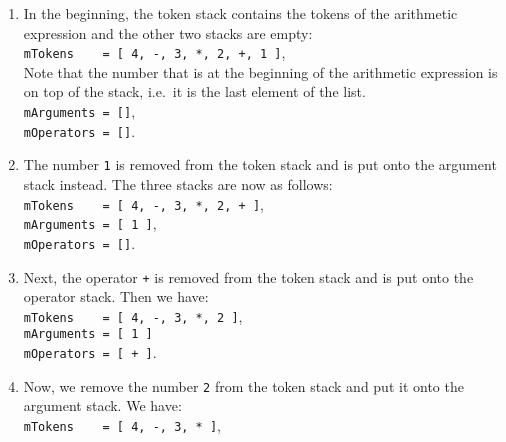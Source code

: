 \begin{enumerate}
\item In the beginning, the token stack contains the tokens of the arithmetic expression and the other two stacks
      are empty: \\[0.2cm]
      \hspace*{1.3cm} 
      \texttt{mTokens \ \ \ = [ 4, -, 3,
        *, 2, +, 1 ]}, 
      \\[0.2cm]
      Note that the number that is at the beginning of the arithmetic expression is on top of the
      stack, i.e.~it is the last element of the list.  \\[0.2cm]
      \hspace*{1.3cm} \texttt{mArguments = []}, \\[0.2cm]
      \hspace*{1.3cm} \texttt{mOperators = []}. 
\item The number \texttt{1} is removed from the token stack and is put onto the argument stack
      instead.  The three stacks are now as follows: \\[0.2cm]
      \hspace*{1.3cm} \texttt{mTokens \ \ \ = [ 4, -, 3, *, 2, + ]}, \\[0.2cm]
      \hspace*{1.3cm} \texttt{mArguments = [ 1 ]}, \\[0.2cm]
      \hspace*{1.3cm} \texttt{mOperators = []}. 
\item Next, the operator \texttt{+} is removed from the token stack and is put
      onto the operator stack.  Then we have: \\[0.2cm]
      \hspace*{1.3cm} \texttt{mTokens \ \ \ = [ 4, -, 3, *, 2 ]}, \\[0.2cm]
      \hspace*{1.3cm} \texttt{mArguments = [ 1 ]} \\[0.2cm]
      \hspace*{1.3cm} \texttt{mOperators = [ + ]}. 
\item Now, we remove the number \texttt{2} from the  token stack and put it onto the argument stack.
      We have: \\[0.2cm]
      \hspace*{1.3cm} \texttt{mTokens \ \ \ = [ 4, -, 3, * ]}, \\[0.2cm]

\end{enumerate}
